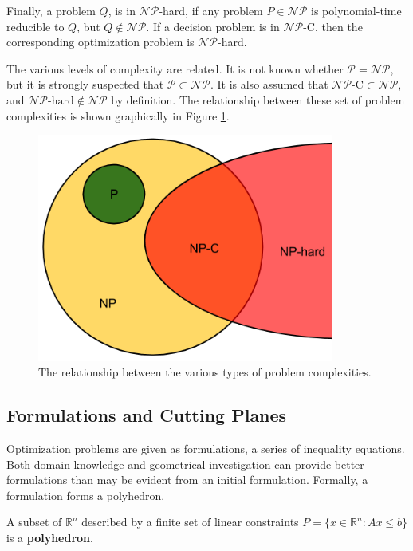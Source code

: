Finally, a problem $Q$, is in $\mathcal{NP}$-hard, if any problem
$P \in \mathcal{NP}$ is polynomial-time reducible to $Q$, but
$Q \not\in \mathcal{NP}$. If a decision problem is in $\mathcal{NP}$-C, then the
corresponding optimization problem is $\mathcal{NP}$-hard.

The various levels of complexity are related. It is not known whether
$\mathcal{P} = \mathcal{NP}$, but it is strongly suspected that
$\mathcal{P} \subset \mathcal{NP}$. It is also assumed that
$\mathcal{NP}\text{-C} \subset \mathcal{NP}$, and
$\mathcal{NP}\text{-hard} \notin \mathcal{NP}$ by definition. The relationship
between these set of problem complexities is shown graphically in
Figure \ref{fig:complexity}.

\begin{figure}[H]
  \begin{center}
    \includegraphics[height=7.5cm]{./chapters/litreview/complexity.png}
  \caption{The relationship between the various types of problem complexities.}
  \label{fig:complexity}
  \end{center}
\end{figure}


\subsection{Formulations and Cutting Planes}\label{sec:formulations}

Optimization problems are given as formulations, a series of inequality
equations. Both domain knowledge and geometrical investigation can provide
better formulations than may be evident from an initial formulation. Formally, a
formulation forms a polyhedron.

\begin{define}\label{def:polyhedron}
A subset of $\mathbb{R}^n$ described by a finite set of linear constraints $P
= \{ x \in \mathbb{R}^n : Ax \leq b\}$ is a \textbf{polyhedron}.
\end{define}

